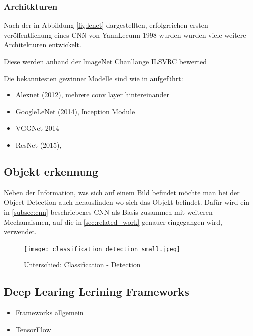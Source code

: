 \subsubsection{Architkturen}\label{subsubsec:architecture}

Nach der in Abbildung \ref{fig:lenet} dargestellten, erfolgreichen
ersten veröffentlichung eines CNN von YannLecunn 1998 \cite{lecunGradientBasedLearningApplied1998}
wurden wurden viele weitere Architekturen entwickelt. 

Diese werden anhand der ImageNet Chanllange ILSVRC \cite{ILSVRC15} bewerted

Die bekanntesten gewinner Modelle sind wie in \cite{StanfordCS231nConvolutional}
aufgeführt:


\begin{itemize}
    \item Alexnet (2012), mehrere conv layer hintereinander
    \item GoogleLeNet (2014), Inception Module
    \item VGGNet 2014
    \item ResNet (2015), 
\end{itemize}

\subsection{Objekt erkennung}\label{subsec:objdet_det}

Neben der Information, was sich auf einem Bild befindet möchte
man bei der Object Detection auch herausfinden wo sich das 
Objekt befindet.
Dafür wird ein in \ref{subsec:cnn} beschriebenes CNN als Basis 
zusammen mit weiteren Mechanaismen, auf die in \ref{sec:related_work}
genauer eingegangen wird, verwendet.
\begin{figure}[htb]
    \centering
    \label{fig:class_vs_det}
    \texttt{[image: classification\_detection\_small.jpeg]}
    \caption{Unterschied: Classification - Detection}
\end{figure}


\subsection{Deep Learing Lerining Frameworks}
\begin{itemize}
    \item Frameworks allgemein
    \item TensorFlow
\end{itemize}



